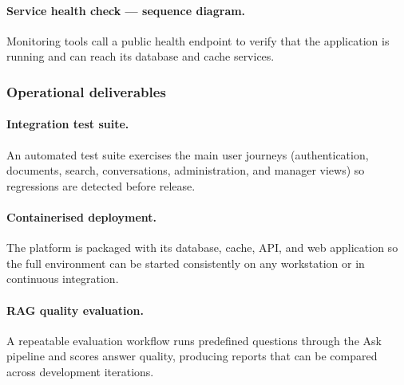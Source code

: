 
\paragraph{Service health check --- sequence diagram.}
Monitoring tools call a public health endpoint to verify that the application is
running and can reach its database and cache services.

\subsubsection{Operational deliverables}
\label{subsubsec:sprint5-operations}

\paragraph{Integration test suite.}
An automated test suite exercises the main user journeys (authentication,
documents, search, conversations, administration, and manager views) so
regressions are detected before release.

\paragraph{Containerised deployment.}
The platform is packaged with its database, cache, API, and web application so the
full environment can be started consistently on any workstation or in continuous
integration.

\paragraph{RAG quality evaluation.}
A repeatable evaluation workflow runs predefined questions through the Ask
pipeline and scores answer quality, producing reports that can be compared across
development iterations.
